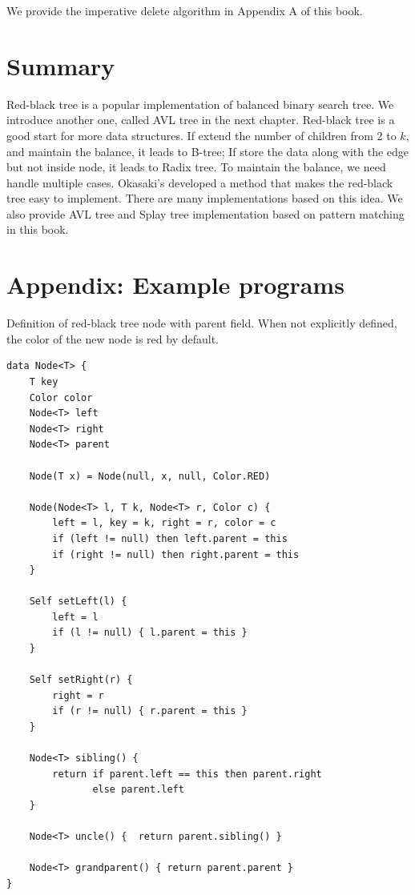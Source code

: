 \documentclass[b5paper]{article}
\begin{document}
We provide the imperative delete algorithm in Appendix A of this book.

\section{Summary}
Red-black tree is a popular implementation of balanced binary search tree. We introduce another one, called AVL tree in the next chapter. Red-black tree is a good start for more data structures. If extend the number of children from 2 to $k$, and maintain the balance, it leads to B-tree; If store the data along with the edge but not inside node, it leads to Radix tree. To maintain the balance, we need handle multiple cases. Okasaki's developed a method that makes the red-black tree easy to implement. There are many implementations based on this idea\cite{rosetta}. We also provide AVL tree and Splay tree implementation based on pattern matching in this book.

\section{Appendix: Example programs}

Definition of red-black tree node with parent field. When not explicitly defined, the color of the new node is red by default.

\begin{lstlisting}[language = Bourbaki]
data Node<T> {
    T key
    Color color
    Node<T> left
    Node<T> right
    Node<T> parent

    Node(T x) = Node(null, x, null, Color.RED)

    Node(Node<T> l, T k, Node<T> r, Color c) {
        left = l, key = k, right = r, color = c
        if (left != null) then left.parent = this
        if (right != null) then right.parent = this
    }

    Self setLeft(l) {
        left = l
        if (l != null) { l.parent = this }
    }

    Self setRight(r) {
        right = r
        if (r != null) { r.parent = this }
    }

    Node<T> sibling() {
        return if parent.left == this then parent.right
               else parent.left
    }

    Node<T> uncle() {  return parent.sibling() }

    Node<T> grandparent() { return parent.parent }
}
\end{lstlisting}
\end{document}
